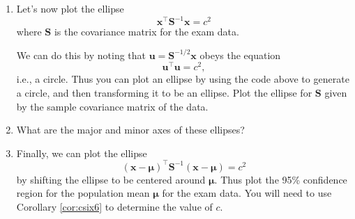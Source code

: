 \documentclass[]{book}
\theoremstyle{definition}
\theoremstyle{definition}
\theoremstyle{definition}
\theoremstyle{remark}
\begin{document}
\begin{enumerate}
\def\labelenumi{\roman{enumi}.}
\setcounter{enumi}{1}
\item
  Let's now plot the ellipse
  \[\mathbf x^\top \mathbf S^{-1}\mathbf x=c^2\]
  where \(\mathbf S\) is the covariance matrix for the exam data.

  We can do this by noting that \(\mathbf u= \mathbf S^{-1/2}\mathbf x\) obeys the equation
  \[\mathbf u^\top\mathbf u=c^2,\]
  i.e., a circle. Thus you can plot an ellipse by using the code above to generate a circle, and then transforming it to be an ellipse. Plot the ellipse for \(\mathbf S\) given by the sample covariance matrix of the data.
\item
  What are the major and minor axes of these ellipses?
\item
  Finally, we can plot the ellipse
  \[(\mathbf x-{\boldsymbol{\mu}})^\top \mathbf S^{-1}(\mathbf x-{\boldsymbol{\mu}})=c^2\]
  by shifting the ellipse to be centered around \({\boldsymbol{\mu}}\). Thus plot the 95\% confidence region for the population mean \({\boldsymbol{\mu}}\) for the exam data. You will need to use Corollary \ref{cor:csix6} to determine the value of \(c\).
\end{enumerate}


\end{document}
